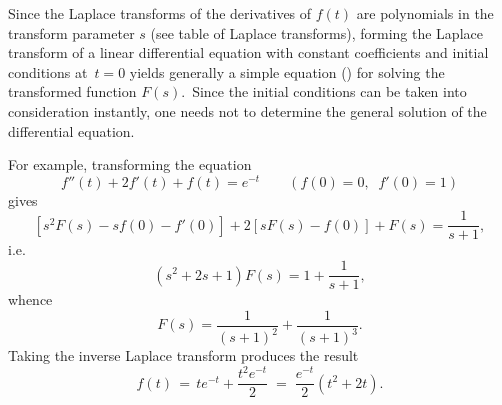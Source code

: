 \documentclass[12pt]{article}
\theoremstyle{definition}
\begin{document}
Since the Laplace transforms of the derivatives of $f(t)$ are 
polynomials in the transform parameter $s$ (see table of Laplace 
transforms), forming the Laplace transform of a linear differential 
equation with constant coefficients and initial conditions at\, 
$t = 0$ yields generally a simple equation 
() for solving the transformed function $F(s)$.\, Since the initial conditions can be taken into consideration instantly, one needs not to determine the general solution of the differential equation.

For example, transforming the equation
$$f''(t)+2f'(t)+f(t) = e^{-t} 
\qquad (f(0) = 0,\;\; f'(0) = 1)$$
gives
$$[s^2F(s)-sf(0)-f'(0)]+2[sF(s)-f(0)]+F(s) = \frac{1}{s+1},$$
i.e. 
$$(s^2+2s+1)F(s) = 1+\frac{1}{s+1},$$
whence
$$F(s) = \frac{1}{(s+1)^2}+\frac{1}{(s+1)^3}.$$
Taking the inverse Laplace transform produces the result
$$f(t) \,=\, te^{-t}+\frac{t^2e^{-t}}{2} \;=\; \frac{e^{-t}}{2}(t^2+2t).$$


\end{document}
